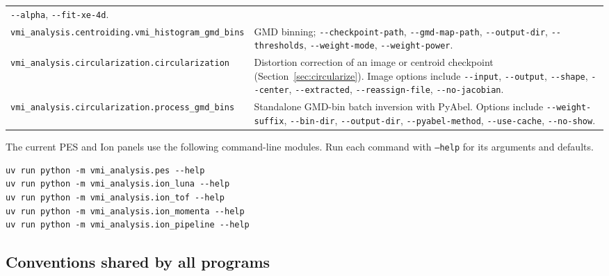 \documentclass[11pt,a4paper]{article}
\newcommand{\code}[1]{\texttt{#1}}
\begin{document}
\begin{center}
\begin{longtable}{@{}L{6.2cm}L{9.0cm}@{}}
\code{-\allowbreak{}-\allowbreak{}alpha}, \code{-\allowbreak{}-\allowbreak{}fit-\allowbreak{}xe-\allowbreak{}4d}. \\
\addlinespace
\code{vmi\_\allowbreak{}analysis.centroiding.vmi\_\allowbreak{}histogram\_\allowbreak{}gmd\_\allowbreak{}bins} & GMD binning;
\code{-\allowbreak{}-\allowbreak{}checkpoint-\allowbreak{}path}, \code{-\allowbreak{}-\allowbreak{}gmd-\allowbreak{}map-\allowbreak{}path}, \code{-\allowbreak{}-\allowbreak{}output-\allowbreak{}dir},
\code{-\allowbreak{}-\allowbreak{}thresholds}, \code{-\allowbreak{}-\allowbreak{}weight-\allowbreak{}mode}, \code{-\allowbreak{}-\allowbreak{}weight-\allowbreak{}power}. \\
\addlinespace
\code{vmi\_\allowbreak{}analysis.circularization.circularization} & Distortion correction
of an image or centroid checkpoint (Section~\ref{sec:circularize}). Image options include
\code{-\allowbreak{}-\allowbreak{}input}, \code{-\allowbreak{}-\allowbreak{}output}, \code{-\allowbreak{}-\allowbreak{}shape}, \code{-\allowbreak{}-\allowbreak{}center},
\code{-\allowbreak{}-\allowbreak{}extracted}, \code{-\allowbreak{}-\allowbreak{}reassign-\allowbreak{}file}, \code{-\allowbreak{}-\allowbreak{}no-\allowbreak{}jacobian}. \\
\addlinespace
\code{vmi\_\allowbreak{}analysis.circularization.process\_\allowbreak{}gmd\_\allowbreak{}bins} & Standalone GMD-bin batch
inversion with PyAbel. Options include \code{-\allowbreak{}-\allowbreak{}weight-\allowbreak{}suffix}, \code{-\allowbreak{}-\allowbreak{}bin-\allowbreak{}dir}, \code{-\allowbreak{}-\allowbreak{}output-\allowbreak{}dir},
\code{-\allowbreak{}-\allowbreak{}pyabel-\allowbreak{}method}, \code{-\allowbreak{}-\allowbreak{}use-\allowbreak{}cache},
\code{-\allowbreak{}-\allowbreak{}no-\allowbreak{}show}. \\
\end{longtable}
\end{center}

The current PES and Ion panels use the following command-line modules.
Run each command with \code{--help} for its arguments and defaults.
\begin{verbatim}
uv run python -m vmi_analysis.pes --help
uv run python -m vmi_analysis.ion_luna --help
uv run python -m vmi_analysis.ion_tof --help
uv run python -m vmi_analysis.ion_momenta --help
uv run python -m vmi_analysis.ion_pipeline --help
\end{verbatim}

\subsection{Conventions shared by all programs}
\end{document}
